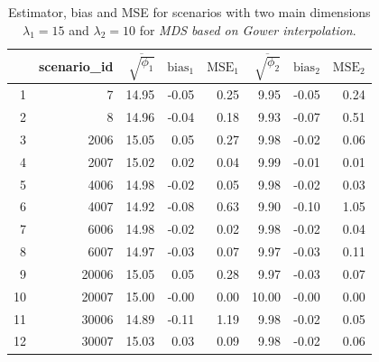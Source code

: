 \documentclass[11pt]{report}
\begin{document}
\begin{table}[ht]
\centering
\begin{tabular}{rrrrrrrr}
 & scenario\_id & $\overline{\sqrt{\phi_1}}$ & $\mbox{bias}_1$ & $\mbox{MSE}_1$ & $\overline{\sqrt{\phi_2}}$ & $\mbox{bias}_2$ & $\mbox{MSE}_2$ \\ 
  \hline
  1 & 7 & 14.95 & -0.05 & 0.25 & 9.95 & -0.05 & 0.24 \\ 
  2 & 8 & 14.96 & -0.04 & 0.18 & 9.93 & -0.07 & 0.51 \\ 
  3 & 2006 & 15.05 & 0.05 & 0.27 & 9.98 & -0.02 & 0.06 \\ 
  4 & 2007 & 15.02 & 0.02 & 0.04 & 9.99 & -0.01 & 0.01 \\ 
  5 & 4006 & 14.98 & -0.02 & 0.05 & 9.98 & -0.02 & 0.03 \\ 
  6 & 4007 & 14.92 & -0.08 & 0.63 & 9.90 & -0.10 & 1.05 \\ 
  7 & 6006 & 14.98 & -0.02 & 0.02 & 9.98 & -0.02 & 0.04 \\ 
  8 & 6007 & 14.97 & -0.03 & 0.07 & 9.97 & -0.03 & 0.11 \\ 
  9 & 20006 & 15.05 & 0.05 & 0.28 & 9.97 & -0.03 & 0.07 \\ 
  10 & 20007 & 15.00 & -0.00 & 0.00 & 10.00 & -0.00 & 0.00 \\ 
  11 & 30006 & 14.89 & -0.11 & 1.19 & 9.98 & -0.02 & 0.05 \\ 
  12 & 30007 & 15.03 & 0.03 & 0.09 & 9.98 & -0.02 & 0.06 \\ 
   \hline
\end{tabular}
\caption{Estimator, bias and MSE for scenarios with two main dimensions $\lambda_1 = 15$ and $\lambda_2 = 10$ for \textit{MDS based on Gower interpolation}.}
\end{table}
\end{document}
